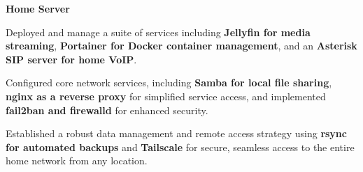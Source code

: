 \documentclass[../main.tex]{subfiles}
\begin{document}
\vspace{0.2 cm}

\begin{twocolentry}{
    \small
    \textit{\href{}{}}
}
    \textbf{Home Server}
\end{twocolentry}

\vspace{0.10 cm}
\begin{onecolentry}
\begin{highlights}
    \item Deployed and manage a suite of services including \textbf{Jellyfin for media streaming}, \textbf{Portainer for Docker container management}, and an \textbf{Asterisk SIP server for home VoIP}.
    \item Configured core network services, including \textbf{Samba for local file sharing}, \textbf{nginx as a reverse proxy} for simplified service access, and implemented \textbf{fail2ban and firewalld} for enhanced security.
    \item Established a robust data management and remote access strategy using \textbf{rsync for automated backups} and \textbf{Tailscale} for secure, seamless access to the entire home network from any location.
\end{highlights}
\end{onecolentry}
\end{document}
